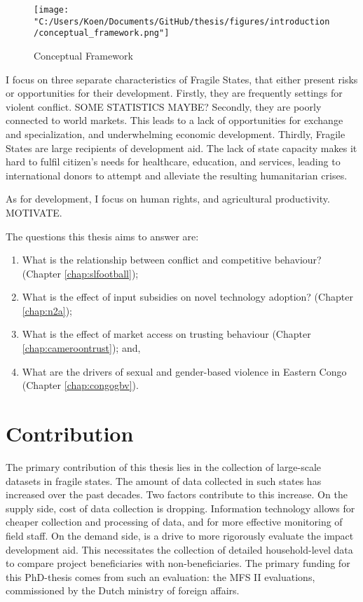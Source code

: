 \begin{figure}[htb]
  \centering
  \texttt{[image: "C:/Users/Koen/Documents/GitHub/thesis/figures/introduction/conceptual\_framework.png"]}
  \caption{Conceptual Framework}
  \label{fig:intro_framework}
\end{figure}


I focus on three separate characteristics of Fragile States, that either present risks or opportunities for their development. Firstly, they are frequently settings for violent conflict. SOME STATISTICS MAYBE? Secondly, they are poorly connected to world markets. This leads to a lack of opportunities for exchange and specialization, and underwhelming economic development. Thirdly, Fragile States are large recipients of development aid. The lack of state capacity makes it hard to fulfil citizen's needs for healthcare, education, and services, leading to international donors to attempt and alleviate the resulting humanitarian crises. 

As for development, I focus on human rights, and agricultural productivity. MOTIVATE.

The questions this thesis aims to answer are:
\begin{enumerate}
	\item What is the relationship between conflict and competitive behaviour? (Chapter \ref{chap:slfootball});
	\item What is the effect of input subsidies on novel technology adoption? (Chapter \ref{chap:n2a});
	\item What is the effect of market access on trusting behaviour (Chapter \ref{chap:cameroontrust}); and,
	\item What are the drivers of sexual and gender-based violence in Eastern Congo (Chapter \ref{chap:congogbv}).
\end{enumerate}

\section{Contribution}
The primary contribution of this thesis lies in the collection of large-scale datasets in fragile states. The amount of data collected in such states has increased over the past decades. Two factors contribute to this increase. On the supply side, cost of data collection is dropping. Information technology allows for cheaper collection and processing of data, and for more effective monitoring of field staff. On the demand side, is a drive to more rigorously evaluate the impact development aid. This necessitates the collection of detailed household-level data to compare project beneficiaries with non-beneficiaries. The primary funding for this PhD-thesis comes from such an evaluation: the MFS II evaluations, commissioned by the Dutch ministry of foreign affairs.

